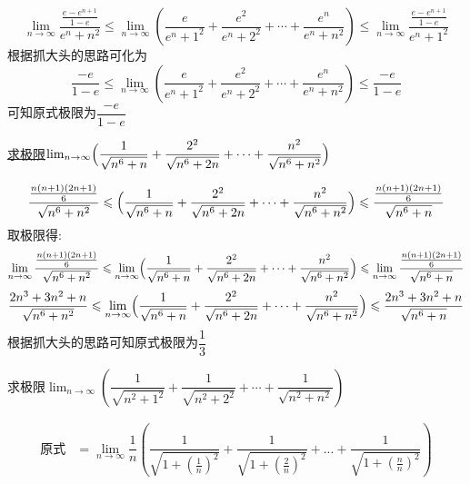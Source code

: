 \documentclass[8pt a4paper, oneside, UTF8]{ctexbook}
\begin{document}
\begin{sloppypar}
\begin{problem}
    \end{problem}
    \begin{solution}
        $$\lim_{n \to \infty} \dfrac{\frac{e-e^{n+1}}{1-e}}{e^n+n^2} \leqslant \lim_{n\to\infty}\left(\dfrac{e}{e^{n}+1^{2}}+\dfrac{e^{2}}{e^{n}+2^{2}}+\cdots+\dfrac{e^{n}}{e^{n}+n^{2}}\right) \leqslant \lim_{n \to \infty} \dfrac{\frac{e-e^{n+1}}{1-e}}{e^n+1^2}$$
        根据抓大头的思路可化为
        $$
            \dfrac{-e}{1-e} \leqslant \lim_{n\to\infty}\left(\dfrac{e}{e^{n}+1^{2}}+\dfrac{e^{2}}{e^{n}+2^{2}}+\cdots+\dfrac{e^{n}}{e^{n}+n^{2}}\right) \leqslant \dfrac{-e}{1-e}
        $$
        可知原式极限为$\dfrac{-e}{1-e}$
    \end{solution}
    \begin{problem}
    \uline{求极限}$\operatorname*{lim}_{n\to\infty}\Bigl(\dfrac{1}{\sqrt{n^{6}+n}}+\dfrac{2^{2}}{\sqrt{n^{6}+2n}}+\cdots+\dfrac{n^{2}}{\sqrt{n^{6}+n^{2}}}\Bigr)$
    \end{problem}
    \begin{solution}
        $$
            \dfrac{\frac{n(n+1)(2n+1)}6}{\sqrt{n^6+n^2}} \leqslant \Bigl(\dfrac{1}{\sqrt{n^{6}+n}}+\dfrac{2^{2}}{\sqrt{n^{6}+2n}}+\cdots+\dfrac{n^{2}}{\sqrt{n^{6}+n^{2}}}\Bigr) \leqslant \dfrac{\frac{n(n+1)(2n+1)}6}{\sqrt{n^6+n}}
        $$
        取极限得:
        $$
            \lim_{n\to\infty} \dfrac{\frac{n(n+1)(2n+1)}6}{\sqrt{n^6+n^2}} \leqslant  \lim_{n\to\infty} \Bigl(\dfrac{1}{\sqrt{n^{6}+n}}+\dfrac{2^{2}}{\sqrt{n^{6}+2n}}+\cdots+\dfrac{n^{2}}{\sqrt{n^{6}+n^{2}}}\Bigr) \leqslant \lim_{n\to\infty} \dfrac{\frac{n(n+1)(2n+1)}6}{\sqrt{n^6+n}}
        $$
        $$
            \dfrac{2n^3+3n^2+n}{\sqrt{n^6+n^2}} \leqslant \lim_{n\to\infty} \Bigl(\dfrac{1}{\sqrt{n^{6}+n}}+\dfrac{2^{2}}{\sqrt{n^{6}+2n}}+\cdots+\dfrac{n^{2}}{\sqrt{n^{6}+n^{2}}}\Bigr) \leqslant \dfrac{2n^3+3n^2+n}{\sqrt{n^6+n}}
        $$
        根据抓大头的思路可知原式极限为$\dfrac{1}{3}$
    \end{solution}
    \begin{problem}
    求极限$\lim_{n\to\infty}\left(\dfrac{1}{\sqrt{n^{2}+1^{2}}}+\dfrac{1}{\sqrt{n^{2}+2^{2}}}+\cdots+\dfrac{1}{\sqrt{n^{2}+n^{2}}}\right)$
    \end{problem}
    \begin{solution}
        \begin{align*}
            \text{原式} & =\lim_{n \to \infty} \dfrac{1}{n}\left(\dfrac{1}{\sqrt{1+(\frac{1}{n})^2}}+\dfrac{1}{\sqrt{1+(\frac{2}{n})^2}}+...+\dfrac{1}{\sqrt{1+(\frac{n}{n})^2}}\right) \\

\end{align*}
\end{solution}
\end{sloppypar}
\end{document}
